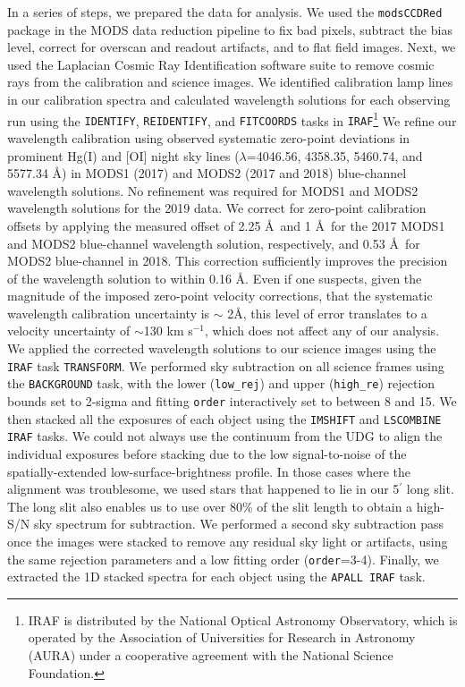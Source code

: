 \documentclass[twocolumn,tighten]{aastex63}
\begin{document}
In a series of steps, we prepared the data for analysis.
We used the {\tt modsCCDRed} package in the MODS data reduction pipeline \citep{Pogge2010} to fix bad pixels, subtract the bias level, correct for overscan and readout artifacts, and to flat field images. Next, we used the Laplacian Cosmic Ray Identification \citep[L.A. Cosmic;][]{vanDokkum2001} software suite to remove cosmic rays from the calibration and science images. We identified calibration lamp lines in our calibration spectra and calculated wavelength solutions for each observing run using the {\tt IDENTIFY}, {\tt REIDENTIFY}, and {\tt FITCOORDS} tasks in {\tt IRAF}\footnote{IRAF is distributed by the National Optical Astronomy Observatory, which is operated by the Association of Universities for Research in Astronomy (AURA) under a cooperative agreement with the National Science Foundation.} We refine our wavelength calibration using observed systematic zero-point deviations in prominent Hg(I) and [OI] night sky lines ($\lambda$=4046.56, 4358.35, 5460.74, and 5577.34 \AA) in MODS1 (2017) and MODS2 (2017 and 2018) blue-channel wavelength solutions. No refinement was required for MODS1 and MODS2 wavelength solutions for the 2019 data.
We correct for zero-point calibration offsets by applying the measured offset of 2.25 \AA\ and 1 \AA\ for the 2017 MODS1 and MODS2 blue-channel wavelength solution, respectively, and 0.53 \AA\  for MODS2 blue-channel in 2018. This correction sufficiently improves the precision of the wavelength solution to within 0.16 \AA. Even if one suspects, given the magnitude of the imposed zero-point velocity corrections, that the systematic wavelength calibration uncertainty is $\sim$ 2\AA, this level of error translates to a velocity uncertainty of $\sim$130 km s$^{-1}$, which does not affect any of our analysis. We applied the corrected wavelength solutions to our science images using the {\tt IRAF} task {\tt TRANSFORM}. We performed sky subtraction on all science frames using the {\tt BACKGROUND} task, with the lower ({\tt low\_rej}) and upper ({\tt high\_re}) rejection bounds set to 2-sigma and fitting {\tt order} interactively set to between 8 and 15. We then stacked all the exposures of each object using the {\tt IMSHIFT} and {\tt LSCOMBINE} {\tt IRAF} tasks. We could not always use the continuum from the UDG to align the individual exposures before stacking due to the low signal-to-noise of the spatially-extended low-surface-brightness profile. In those cases where the alignment was troublesome, we used stars that happened to lie in our 5$^\prime$ long slit. The long slit also enables us to use over 80\% of the slit length to obtain a high-S/N sky spectrum for subtraction. We performed a second sky subtraction pass once the images were stacked to remove any residual sky light or artifacts, using the same rejection parameters and a low fitting order ({\tt order}=3-4). Finally, we extracted the 1D stacked spectra for each object using the {\tt APALL IRAF} task. 
\end{document}
